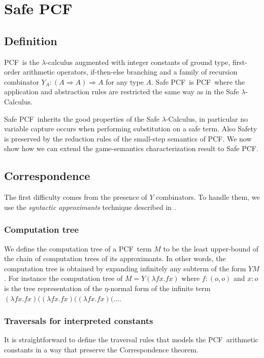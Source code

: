 \documentclass{llncs}
\newcommand\typar{\Rightarrow}
\newcommand\pcf{\textsf{PCF}}
\begin{document}
\section{Safe \pcf}

\subsection{Definition}
\pcf\ is the $\lambda$-calculus augmented with integer constants of ground type, first-order arithmetic operators, if-then-else branching
and a family of recursion combinator $Y_A : (A \typar A) \typar A$ for any type $A$.
Safe \pcf\ is \pcf\ where the application and abstraction rules are restricted the same
way as in the Safe $\lambda$-Calculus.

Safe \pcf\ inherits the good properties of the Safe $\lambda$-Calculus, in particular
no variable capture occurs when performing substitution on a safe term. Also Safety is preserved by the reduction rules
of the small-step semantics of \pcf.  We now show how we can extend the game-semantics characterization result to Safe \pcf.

\subsection{Correspondence}
The first difficulty comes from the presence of $Y$ combinators.
To handle them, we use the \emph{syntactic approximants} technique described in \cite{abramsky:game-semantics-tutorial}.

\subsubsection{Computation tree}
We define the computation tree of a \pcf\ term $M$ to be the least upper-bound of
the chain of computation trees of its approximants.
In other words, the computation tree is obtained by expanding
infinitely any subterm of the form $Y M$. For instance the computation tree
of $M = Y (\lambda f x. f x)$ where $f:(o,o)$ and $x:o$ is
the tree representation of the $\eta$-normal form of the infinite term
$(\lambda f x. f x) ((\lambda f x. f x) ((\lambda f x. f x)  (
\ldots$.



\subsubsection{Traversals for interpreted constants}

It is straightforward to define the traversal rules that models the \pcf\ arithmetic constants in a way that
preserve the Correspondence theorem.
\end{document}
